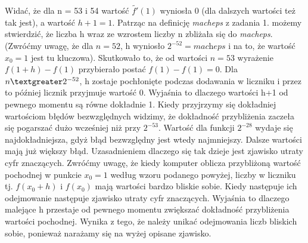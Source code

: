 \documentclass[]{article}
\begin{document}
	Widać, że dla n = 53 i 54 wartość $\widetilde{f'}(1)$ wyniosła 0 (dla dalszych wartości też tak jest), a wartość $h + 1 = 1$. Patrząc na definicję \textit{macheps} z zadania 1. możemy stwierdzić, że liczba h wraz ze wzrostem liczby n zbliżała się do \textit{macheps}. (Zwróćmy uwagę, że dla $n = 52$, h wyniosło $2^{-52} = \textit{macheps}$ i na to, że wartość $x_0 = 1$ jest tu kluczowa). Skutkowało to, że od wartości $n = 53$ wyrażenie $f(1 + h) - f(1)$ przybierało postać $f(1) - f(1) = 0$. Dla $n\space \textgreater\space 2^{-52}$, h zostaje pochłonięte podczas dodawania w liczniku i przez to później licznik przyjmuje wartość 0. Wyjaśnia to dlaczego wartości h+1 od pewnego momentu są równe dokładnie 1.\newline
	Kiedy przyjrzymy się dokładniej wartościom błędów bezwzględnych widzimy, że dokładność przybliżenia zaczeła się pogarszać dużo wcześniej niż przy \(2^{-53}\). Wartość dla funkcji \(2^{-28}\) wydaje się najdokładniejsza, gdyż błąd bezwzględny jest wtedy najmniejszy. Dalsze wartości mają już większy błąd.
	Uzasadnieniem dlaczego się tak dzieje jest zjawisko utraty cyfr znaczących. \newline
	Zwróćmy uwagę, że kiedy komputer oblicza przybliżoną wartość pochodnej w punkcie $x_0 = 1$ według wzoru podanego powyżej, liczby w liczniku tj. $f(x_0 + h)$ i $f(x_0)$ mają wartości bardzo bliskie sobie. Kiedy następuje ich odejmowanie następuje zjawisko utraty cyfr znaczących. 
	Wyjaśnia to dlaczego malejące h przestaje od pewnego momentu zwiększać dokładność przybliżenia wartości pochodnej. Wynika z tego, że należy unikać odejmowania liczb bliskich sobie, ponieważ narażamy się na wyżej opisane zjawisko.
	
	
	
	
\end{document}
